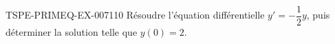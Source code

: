 \begin{exercice}{TSPE-PRIMEQ-EX-007}{1}{10}
Résoudre l'équation différentielle $y' = -\dfrac{1}{2}y$, puis déterminer la solution telle que $y(0)=2$.
\end{exercice}
